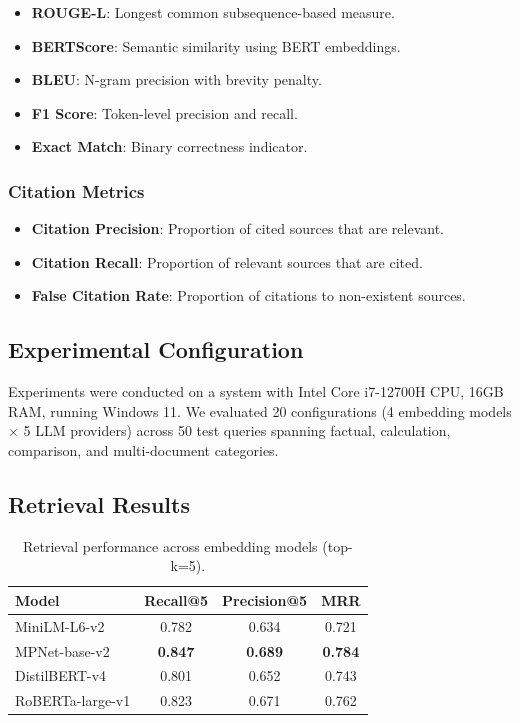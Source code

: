 \documentclass[runningheads]{llncs}
\begin{document}
\begin{itemize}
    \item \textbf{ROUGE-L}: Longest common subsequence-based measure.
    \item \textbf{BERTScore}: Semantic similarity using BERT embeddings.
    \item \textbf{BLEU}: N-gram precision with brevity penalty.
    \item \textbf{F1 Score}: Token-level precision and recall.
    \item \textbf{Exact Match}: Binary correctness indicator.
\end{itemize}

\subsubsection{Citation Metrics}

\begin{itemize}
    \item \textbf{Citation Precision}: Proportion of cited sources that are relevant.
    \item \textbf{Citation Recall}: Proportion of relevant sources that are cited.
    \item \textbf{False Citation Rate}: Proportion of citations to non-existent sources.
\end{itemize}

\subsection{Experimental Configuration}

Experiments were conducted on a system with Intel Core i7-12700H CPU, 16GB RAM, running Windows 11. We evaluated 20 configurations (4 embedding models $\times$ 5 LLM providers) across 50 test queries spanning factual, calculation, comparison, and multi-document categories.

\subsection{Retrieval Results}

\begin{table}[h]
\centering
\caption{Retrieval performance across embedding models (top-k=5).}
\label{tab:retrieval_results}
\begin{tabular}{lccc}
\toprule
\textbf{Model} & \textbf{Recall@5} & \textbf{Precision@5} & \textbf{MRR} \\
\midrule
MiniLM-L6-v2 & 0.782 & 0.634 & 0.721 \\
MPNet-base-v2 & \textbf{0.847} & \textbf{0.689} & \textbf{0.784} \\
DistilBERT-v4 & 0.801 & 0.652 & 0.743 \\
RoBERTa-large-v1 & 0.823 & 0.671 & 0.762 \\
\bottomrule
\end{tabular}
\end{table}
\end{document}

